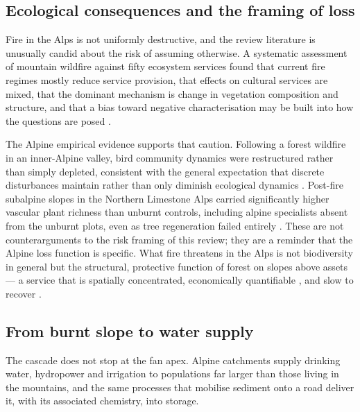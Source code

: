 \documentclass[11pt,a4paper]{article}
\begin{document}
\subsection{Ecological consequences and the framing of loss}

Fire in the Alps is not uniformly destructive, and the review literature is unusually candid about the risk of assuming otherwise. A systematic assessment of mountain wildfire against fifty ecosystem services found that current fire regimes mostly reduce service provision, that effects on cultural services are mixed, that the dominant mechanism is change in vegetation composition and structure, and that a bias toward negative characterisation may be built into how the questions are posed \citep{vukomanovic_systematic_2019}.

The Alpine empirical evidence supports that caution. Following a forest wildfire in an inner-Alpine valley, bird community dynamics were restructured rather than simply depleted, consistent with the general expectation that discrete disturbances maintain rather than only diminish ecological dynamics \citep{rey_effects_2019}. Post-fire subalpine slopes in the Northern Limestone Alps carried significantly higher vascular plant richness than unburnt controls, including alpine specialists absent from the unburnt plots, even as tree regeneration failed entirely \citep{degiuli_arrested_2024}. These are not counterarguments to the risk framing of this review; they are a reminder that the Alpine loss function is specific. What fire threatens in the Alps is not biodiversity in general but the structural, protective function of forest on slopes above assets --- a service that is spatially concentrated, economically quantifiable \citep{moos_climate_2021}, and slow to recover \citep{stritih_alternative_2023, degiuli_arrested_2024}.

\subsection{From burnt slope to water supply}

The cascade does not stop at the fan apex. Alpine catchments supply drinking water, hydropower and irrigation to populations far larger than those living in the mountains, and the same processes that mobilise sediment onto a road deliver it, with its associated chemistry, into storage.
\end{document}
